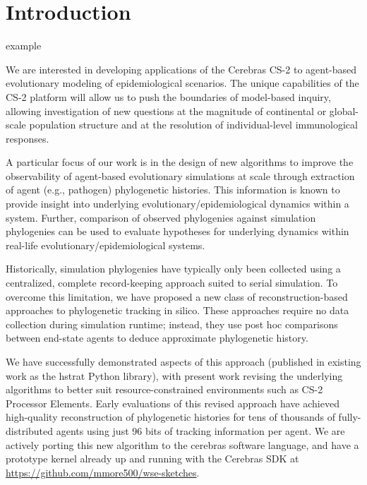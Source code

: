 \section{Introduction} \label{sec:introduction}

example \citep{gagliardi2019international}





We are interested in developing applications of the Cerebras CS-2 to agent-based evolutionary modeling of epidemiological scenarios.
The unique capabilities of the CS-2 platform will allow us to push the boundaries of model-based inquiry, allowing investigation of new questions at the magnitude of continental or global-scale population structure and at the resolution of individual-level immunological responses.

A particular focus of our work is in the design of new algorithms to improve the observability of agent-based evolutionary simulations at scale through extraction of agent (e.g., pathogen) phylogenetic histories.
This information is known to provide insight into underlying evolutionary/epidemiological dynamics within a system.
Further, comparison of observed phylogenies against simulation phylogenies can be used to evaluate hypotheses for underlying dynamics within real-life evolutionary/epidemiological systems.

Historically, simulation phylogenies have typically only been collected using a centralized, complete record-keeping approach suited to serial simulation.
To overcome this limitation, we have proposed a new class of reconstruction-based approaches to phylogenetic tracking in silico.
These approaches require no data collection during simulation runtime; instead, they use post hoc comparisons between end-state agents to deduce approximate phylogenetic history.

We have successfully demonstrated aspects of this approach (published in existing work as the hstrat Python library), with present work revising the underlying algorithms to better suit resource-constrained environments such as CS-2 Processor Elements.
Early evaluations of this revised approach have achieved high-quality reconstruction of phylogenetic histories for tens of thousands of fully-distributed agents using just 96 bits of tracking information per agent.
We are actively porting this new algorithm to the cerebras software language, and have a prototype kernel already up and running with the Cerebras SDK at \url{https://github.com/mmore500/wse-sketches}.

